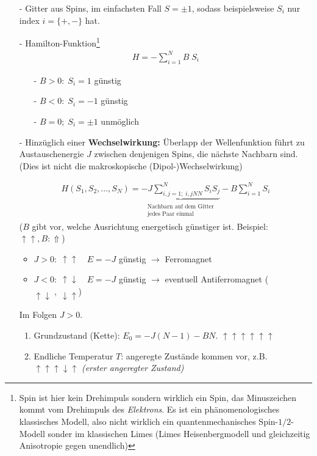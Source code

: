 \documentclass[12pt]{article}
\begin{document}
 \begin{itemize}
\item[-] Gitter aus Spins, im einfachsten Fall $S= \pm 1$, sodass beispielsweise $S_i$ nur index $i= \{+,-\}$ hat.
\item[-]Hamilton-Funktion\footnote{Spin ist hier kein Drehimpuls sondern wirklich ein Spin, das Minuszeichen kommt vom Drehimpuls des \textit{Elektrons}. Es ist ein phänomenologisches klassisches Modell, also nicht wirklich ein quantenmechanisches Spin-$1/2$-Modell sonder im klassischen Limes (Limes Heisenbergmodell und gleichzeitig Anisotropie gegen unendlich)}
\begin{align}
H= - \sum_{i=1}^N B \; S_i
\end{align}
\begin{itemize}
\item[-] $B> 0 : \; S_i = 1$ günstig 
\item[-]  $B<0 : \; S_i = -1$ günstig 
\item[-] $B=0; \; S_i = \pm 1$ unmöglich
\end{itemize}
 \item[-]Hinzüglich einer \textbf{Wechselwirkung:} Überlapp der Wellenfunktion führt zu Austauschenergie $J$ zwischen denjenigen Spins, die nächste Nachbarn sind. (Dies ist nicht die makroskopische (Dipol-)Wechselwirkung) 
 
 \begin{align}
  H(S_1, S_2, ..., S_N) = \underbrace{ -J \sum_{i,j=1;\; i,j NN}^N S_i S_j }_{\substack{\text{Nachbarn auf dem Gitter} \\ \text{jedes Paar einmal}}} - B \sum_{i=1}^N S_i
\end{align}  
($B$ gibt vor, welche Ausrichtung energetisch günstiger ist. Beispiel: $\uparrow \uparrow, B: \Uparrow$)
  \begin{itemize}
  \item $J>0: \; \uparrow \uparrow  \quad E= -J$ günstig $\rightarrow$ Ferromagnet
  \item $J<0: \; \uparrow \downarrow  \quad E= -J$ günstig $\rightarrow$ eventuell Antiferromagnet ($\uparrow \downarrow \; , \; \downarrow \uparrow$)
  \end{itemize}
  Im Folgen $J>0$. 

\begin{enumerate}
\item Grundzustand (Kette): $E_0= -J(N-1)-BN $. $\uparrow \uparrow \uparrow \uparrow \uparrow \uparrow$
\item Endliche Temperatur $T$: angeregte Zustände kommen vor, z.B. $\uparrow \uparrow \uparrow \downarrow \uparrow$ \textit{(erster angeregter Zustand)}
\end{enumerate}


\end{itemize}
\end{document}

